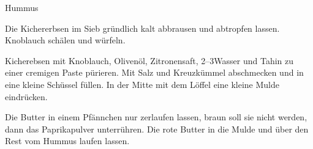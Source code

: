 \begin{recipe}{Hummus}

    \begin{ingredients}
    \end{ingredients}

    \begin{instructions}
        Die Kichererbsen im Sieb gründlich kalt abbrausen und abtropfen lassen.
        Knoblauch schälen und würfeln.

        Kicherebsen mit Knoblauch, Olivenöl, Zitronensaft, 2--3\el Wasser und Tahin zu einer cremigen Paste pürieren.
        Mit Salz und Kreuzkümmel abschmecken und in eine kleine Schüssel füllen.
        In der Mitte mit dem Löffel eine kleine Mulde eindrücken.

        Die Butter in einem Pfännchen nur zerlaufen lassen, braun soll sie nicht werden, dann das Paprikapulver unterrühren.
        Die rote Butter in die Mulde und über den Rest vom Hummus laufen lassen.
    \end{instructions}
\end{recipe}
